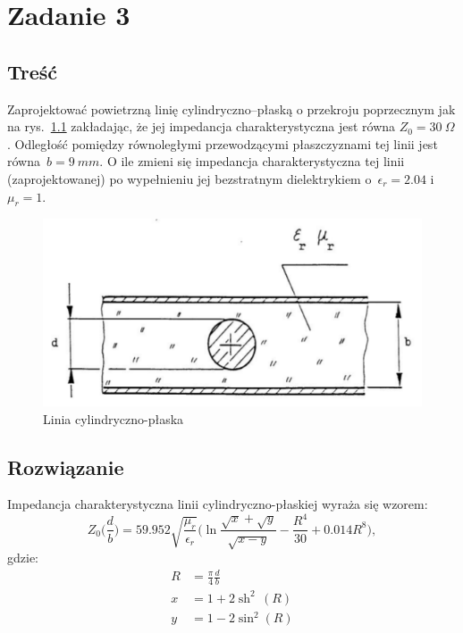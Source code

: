 \documentclass[rep.tex]{subfiles}
\begin{document}
\chapter{Zadanie 3}
\label{zad3}
\section{Treść}
Zaprojektować powietrzną linię cylindryczno–płaską o przekroju poprzecznym jak na rys.~\ref{fig:zad3:line} zakładając,
że jej impedancja charakterystyczna jest równa $Z_0 = 30~\Omega$.
Odległość pomiędzy równoległymi przewodzącymi płaszczyznami tej linii jest równa~$b = 9~mm$.
O ile zmieni się impedancja charakterystyczna tej linii (zaprojektowanej) po wypełnieniu jej
bezstratnym dielektrykiem o~$\epsilon_r = 2.04$ i $\mu_r = 1$.

\begin{figure}[!htbp]
  \centering
  \includegraphics[scale=0.5]{fig/zad3/line}
  \caption{Linia cylindryczno-płaska}
  \label{fig:zad3:line}
\end{figure}

\section{Rozwiązanie}
Impedancja charakterystyczna linii cylindryczno-płaskiej wyraża się wzorem:
\begin{equation}
  Z_0\Big(\frac{d}{b}\Big) = 59.952 \sqrt{\frac{\mu_r}{\epsilon_r}} \Big(\ln{\frac{\sqrt{x} + \sqrt{y}}{\sqrt{x - y}}} - \frac{R^4}{30} + 0.014R^8\Big),
  \label{eqn:zad3:z}
\end{equation}
gdzie:
\begin{align}
  R &= \frac{\pi}{4} \frac{d}{b} \\
  x &= 1 + 2\operatorname{sh}^2\,(R) \\
  y &= 1 - 2\sin^2(R)
\end{align}
\end{document}
